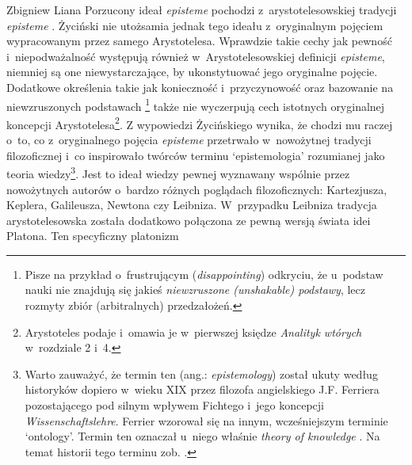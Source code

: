 \begin{artplenv}{Zbigniew Liana}
Porzucony ideał \textit{episteme} pochodzi z~arystotelesowskiej tradycji \textit{episteme}
\parencites[s.~102]{zycinski_jezyk_1983}[s.~46–55]{zycinski_granice_1993}.
Życiński nie utożsamia jednak tego ideału z~oryginalnym pojęciem wypracowanym
przez samego Arystotelesa. Wprawdzie takie cechy jak pewność i~niepodważalność występują również w~Arystotelesowskiej
definicji \textit{episteme}, niemniej są one niewystarczające, by ukonstytuować jego oryginalne pojęcie. Dodatkowe
określenia takie jak konieczność i~przyczynowość
\parencite[s.~46]{zycinski_granice_1993}
oraz bazowanie na
niewzruszonych podstawach
\parencites[s.~143]{zycinski_structure_1988}[s.~253]{zycinski_struktura_2013}\footnote{Pisze na
przykład o~frustrującym (\textit{disappointing})
odkryciu, że u~podstaw nauki nie znajdują się jakieś \textit{niewzruszone (unshakable) podstawy}, lecz rozmyty zbiór
(arbitralnych) przedzałożeń.} także nie wyczerpują cech istotnych oryginalnej koncepcji
Arystotelesa\footnote{Arystoteles podaje i~omawia je w~pierwszej księdze \textit{Analityk wtórych} w~rozdziale 2 i~4.}. Z
wypowiedzi Życińskiego
\parencite*[s.~46]{zycinski_granice_1993}
wynika, że chodzi mu raczej o~to, co z~oryginalnego
pojęcia \textit{episteme} przetrwało w~nowożytnej tradycji filozoficznej i~co inspirowało twórców terminu `epistemologia'
rozumianej jako teoria wiedzy\footnote{Warto zauważyć, że termin ten (ang.: \textit{epistemology}) został ukuty według
historyków dopiero w~wieku XIX przez filozofa angielskiego J.F. Ferriera pozostającego pod silnym wpływem Fichtego i~jego
koncepcji \textit{Wissenschaftslehre}. Ferrier wzorował się na innym, wcześniejszym terminie `ontology'. Termin ten
oznaczał u~niego właśnie \textit{theory of knowledge}
\parencite[zob.][s.~44]{ferrier_institutes_1854}.
Na temat
historii tego terminu zob.
\parencite[s.~63–66]{sinacoer_lepistemologie_1973}.
}. Jest to ideał wiedzy pewnej
wyznawany wspólnie przez nowożytnych autorów o~bardzo różnych poglądach filozoficznych: Kartezjusza, Keplera,
Galileusza, Newtona czy Leibniza. W~przypadku Leibniza
\parencite[s.~51]{zycinski_granice_1993}
tradycja arystotelesowska została dodatkowo połączona ze pewną wersją świata idei Platona. Ten specyficzny platonizm

\end{artplenv}
